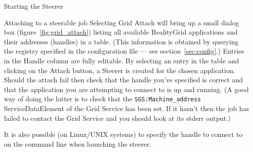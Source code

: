 \documentclass[a4paper,twoside]{article}
\begin{document}
\begin{section}{Starting the Steerer}
\begin{subsection}{Attaching to a steerable job}
Selecting Grid Attach will bring up a small dialog box
(figure~\ref{fig:grid_attach}) listing all available RealityGrid
applications and their addresses (handles) in a table.  (This
information is obtained by querying the registry specified in the
configuration file --- see section~\ref{sec:config}.) Entries in the
Handle column are fully editable.  By selecting an entry in the table
and clicking on the Attach button, a Steerer is created for the chosen
application. Should the attach fail then check that the handle you've
specified is correct and that the application you are attempting to
connect to is up and running.  (A good way of doing the latter is to
check that the \texttt{SGS:Machine\_address} ServiceDataElement of the
Grid Service has been set.  If it hasn't then the job has failed to
contact the Grid Service and you should look at its stderr output.)

It is also possible (on Linux/UNIX systems) to specify the handle to
connect to on the command line when launching the steerer.

\end{subsection}
\end{section}

\end{document}
